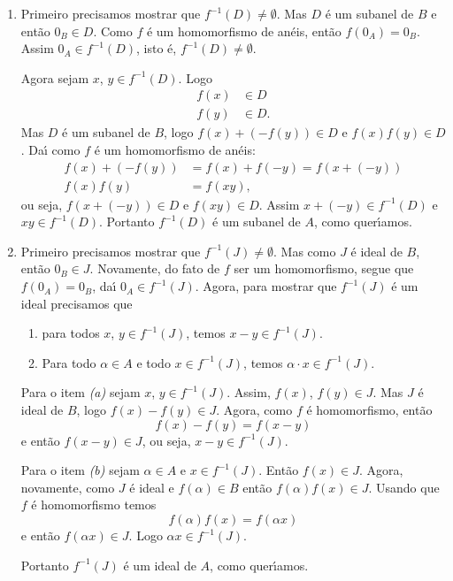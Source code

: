 \documentclass[12pt]{exam}
\begin{document}
	\begin{enumerate}[label={\roman*})]
		\item Primeiro precisamos mostrar que $f^{-1}(D) \ne \emptyset$. Mas $D$ \'e um subanel de $B$ e ent\~ao $0_B \in D$. Como $f$ \'e um homomorfismo de an\'eis, ent\~ao $f(0_A) = 0_B$. Assim $0_A \in f^{-1}(D)$, isto \'e, $f^{-1}(D) \ne \emptyset$.

		Agora sejam $x$, $y \in f^{-1}(D)$. Logo
		\begin{align*}
			f(x) &\in D\\
			f(y) &\in D.
		\end{align*}
		Mas $D$ \'e um subanel de $B$, logo $f(x) + (-f(y)) \in D$ e $f(x)f(y) \in D$. Da{\'\i} como $f$ \'e um homomorfismo de an\'eis:
		\begin{align*}
			f(x) + (-f(y)) &= f(x) + f(-y) = f(x + (-y))\\
			f(x)f(y) &= f(xy),
		\end{align*}
		ou seja, $f(x + (-y)) \in D$ e $f(xy) \in D$. Assim $x + (-y) \in f^{-1}(D)$ e $xy \in f^{-1}(D)$. Portanto $f^{-1}(D)$ \'e um subanel de $A$, como quer{\'\i}amos.

		\item Primeiro precisamos mostrar que $f^{-1}(J) \ne \emptyset$. Mas como $J$ \'e ideal de $B$, ent\~ao $0_B \in J$. Novamente, do fato de $f$ ser um homomorfismo, segue que $f(0_A) = 0_B$, da{\'\i} $0_A \in f^{-1}(J)$. Agora, para mostrar que $f^{-1}(J)$ \'e um ideal precisamos que
		\begin{enumerate}
			\item para todos $x$, $y \in f^{-1}(J)$, temos $x - y \in f^{-1}(J)$.
			\item Para todo $\alpha \in A$ e todo $x \in f^{-1}(J)$, temos $\alpha\cdot x \in f^{-1}(J)$.
		\end{enumerate}

		Para o item \textit{(a)} sejam $x$, $y \in f^{-1}(J)$. Assim, $f(x)$, $f(y) \in J$. Mas $J$ \'e ideal de $B$, logo $f(x) - f(y) \in J$. Agora, como $f$ \'e homomorfismo, ent\~ao
		\[
			f(x) - f(y) = f(x - y)
		\]
		e ent\~ao $f(x - y) \in J$, ou seja, $x - y \in f^{-1}(J)$.

		Para o item \textit{(b)} sejam $\alpha \in A$ e $x \in f^{-1}(J)$. Ent\~ao $f(x) \in J$. Agora, novamente, como $J$ \'e ideal e $f(\alpha) \in B$ ent\~ao $f(\alpha)f(x) \in J$. Usando que $f$ \'e homomorfismo temos
		\[
			f(\alpha)f(x) = f(\alpha x)
		\]
		e ent\~ao $f(\alpha x) \in J$. Logo $\alpha x \in f^{-1}(J)$.

		Portanto $f^{-1}(J)$ \'e um ideal	 de $A$, como quer{\'\i}amos.
	\end{enumerate}
\end{document}
